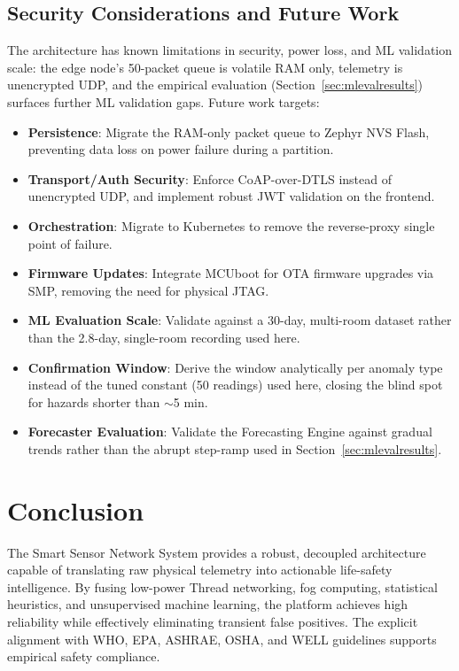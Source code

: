 \documentclass[conference]{IEEEtran}
\begin{document}
\subsection{Security Considerations and Future Work}
\label{sec:futurework}
The architecture has known limitations in security, power loss, and ML validation scale: the edge node's 50-packet queue is volatile RAM only, telemetry is unencrypted UDP, and the empirical evaluation (Section~\ref{sec:mlevalresults}) surfaces further ML validation gaps. Future work targets:
\begin{itemize}
\setlength{\itemsep}{0pt}
\item \textbf{Persistence}: Migrate the RAM-only packet queue to Zephyr NVS Flash, preventing data loss on power failure during a partition.
\item \textbf{Transport/Auth Security}: Enforce CoAP-over-DTLS instead of unencrypted UDP, and implement robust JWT validation on the frontend.
\item \textbf{Orchestration}: Migrate to Kubernetes to remove the reverse-proxy single point of failure.
\item \textbf{Firmware Updates}: Integrate MCUboot for OTA firmware upgrades via SMP, removing the need for physical JTAG.
\item \textbf{ML Evaluation Scale}: Validate against a 30-day, multi-room dataset rather than the 2.8-day, single-room recording used here.
\item \textbf{Confirmation Window}: Derive the window analytically per anomaly type instead of the tuned constant (50 readings) used here, closing the blind spot for hazards shorter than $\sim$5 min.
\item \textbf{Forecaster Evaluation}: Validate the Forecasting Engine against gradual trends rather than the abrupt step-ramp used in Section~\ref{sec:mlevalresults}.
\end{itemize}

\section{Conclusion}
The Smart Sensor Network System provides a robust, decoupled architecture capable of translating raw physical telemetry into actionable life-safety intelligence. By fusing low-power Thread networking, fog computing, statistical heuristics, and unsupervised machine learning, the platform achieves high reliability while effectively eliminating transient false positives. The explicit alignment with WHO, EPA, ASHRAE, OSHA, and WELL guidelines supports empirical safety compliance.
\end{document}
